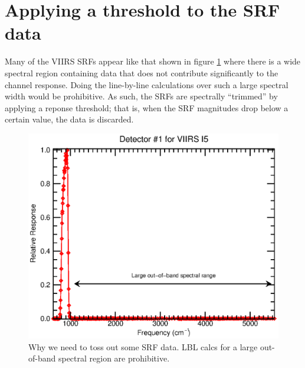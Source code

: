 \section{Applying a threshold to the SRF data}
Many of the VIIRS SRFs appear like that shown in figure \ref{fig:lots_of_unused_data} where there is a wide spectral region containing data that does not contribute significantly to the channel response. Doing the line-by-line calculations over such a large spectral width would be prohibitive. As such, the SRFs are spectrally ``trimmed'' by applying a reponse threshold; that is, when the SRF magnitudes drop below a certain value, the data is discarded.
\begin{figure}[H]
  \centering
  \includegraphics[bb= 0 15 400 330,clip,scale=0.75]{graphics/lots_of_unused_data.eps}
  \caption{Why we need to toss out some SRF data. LBL calcs for a large out-of-band spectral region are prohibitive.}
  \label{fig:lots_of_unused_data}
\end{figure}

